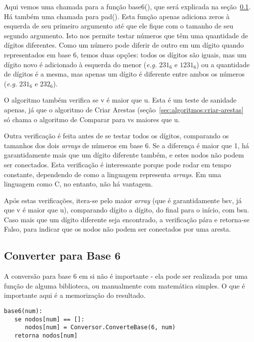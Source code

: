 \documentclass[12pt]{article}
\begin{document}
Aqui vemos uma chamada para a fun\c{c}ão {\sf base6()}, que será explicada na se\c{c}ão~\ref{sec:algoritmos:base6}.
Há também uma chamada para {\sf pad()}. Esta fun\c{c}ão apenas adiciona zeros à esquerda de seu primeiro argumento até que ele fique com o tamanho de seu segundo argumento. Isto nos permite testar números que têm uma quantidade de dígitos diferentes.
Como um número pode diferir de outro em um dígito quando representados em base 6, temos duas op\c{c}ões: todos os dígitos são iguais, mas um dígito novo é adicionado à esquerda do menor (\textit{e.g.} $231_6$ e $1231_6$) ou a quantidade de dígitos é a mesma, mas apenas um dígito é diferente entre ambos os números (\textit{e.g.} $231_6$ e $232_6$).

O algoritmo também verifica se {\sf v} é maior que {\sf u}. Esta é um teste de sanidade apenas, já que o algoritmo de Criar Arestas (se\c{c}ão~\ref{sec:algoritmos:criar-arestas} só chama o algoritmo de Comparar para {\sf v}s maiores que {\sf u}.

Outra verifica\c{c}ão é feita antes de se testar todos os dígitos, comparando os tamanhos dos dois \textit{arrays} de números em base 6. Se a diferen\c{c}a é maior que 1, há garantidamente mais que um dígito diferente também, e estes nodos não podem ser conectados. Esta verifica\c{c}ão é interessante porque pode rodar em tempo constante, dependendo de como a linguagem representa \textit{arrays}. Em uma linguagem como C, no entanto, não há vantagem.

Após estas verifica\c{c}ões, itera-se pelo maior \textit{array} (que é garantidamente {\sf bsv}, já que {\sf v} é maior que {\sf u}), comparando dígito a dígito, do final para o início, com {\sf bsu}. Caso mais que um dígito diferente seja encontrado, a verifica\c{c}ão pára e retorna-se Falso, para indicar que os nodos não podem ser conectados por uma aresta.

\subsection{Converter para Base 6}\label{sec:algoritmos:base6}
A conversão para base 6 em si não é importante - ela pode ser realizada por uma fun\c{c}ão de alguma biblioteca, ou manualmente com matemática simples. O que é importante aqui é a memoriza\c{c}ão do resultado.
\begin{lstlisting}
base6(num):
   se nodos[num] == []:
      nodos[num] = Conversor.ConverteBase(6, num)
   retorna nodos[num]
\end{lstlisting}
\end{document}
